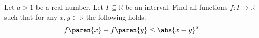 Let $a > 1$ be a real number.
Let $I \subseteq \mathbb{R}$ be an interval.
Find all functions $f: I \to \mathbb{R}$
such that for any $x, y \in \mathbb{R}$ the following holds:
\begin{equation*}
  f\paren{x} - f\paren{y} \leq \abs{x - y}^{a}
\end{equation*}
